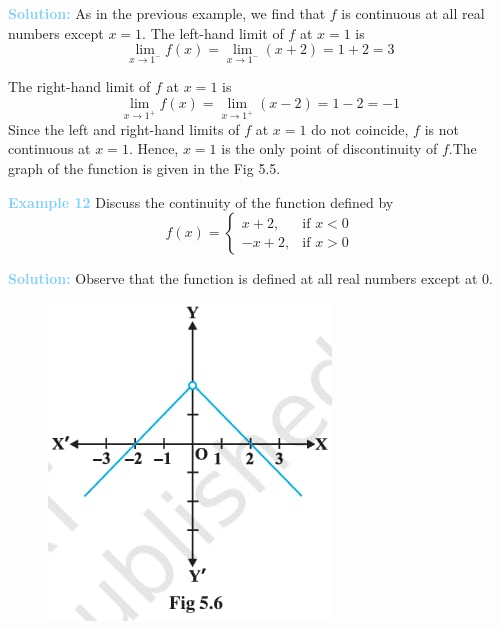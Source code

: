 \documentclass[a4paper,12pt]{article}
\begin{document}
\noindent \textbf{\textcolor{skyblue}{Solution:}} As in the previous example, we find that $f$ is continuous at all real numbers except $x = 1$. The left-hand limit of $f$ at $x = 1$ is
\[
\lim\limits_{x \to 1^-} f(x) = \lim\limits_{x \to 1^-} (x+2) = 1+2 = 3
\]

\noindent The right-hand limit of $f$ at $x = 1$ is
\[
\lim\limits_{x \to 1^+} f(x) = \lim\limits_{x \to 1^+} (x-2) = 1-2 = -1
\]
\hspace{10pt} Since the left and right-hand limits of $f$ at $x = 1$ do not coincide, $f$ is not continuous at $x = 1$. Hence, $x = 1$ is the only point of discontinuity of $f$.The graph of the function is given in the Fig 5.5.

\hfill






\newpage
\pagestyle{fancy}       %
\fancyhf{}    

\noindent \textbf{\textcolor{skyblue}{Example 12}} Discuss the continuity of the function defined by
\[
f(x) = \begin{cases} 
    x + 2, & \text{if } x < 0 \\
    -x + 2, & \text{if } x > 0
\end{cases}
\]

\noindent \textbf{\textcolor{skyblue}{Solution:}} Observe that the function is defined at all real numbers except at $0$.

\begin{figure}
    \centering
    \includegraphics[width=1\linewidth]{c.jpg}
    \vspace{-2cm}
\end{figure}
\hspace{-2cm}
\end{document}
